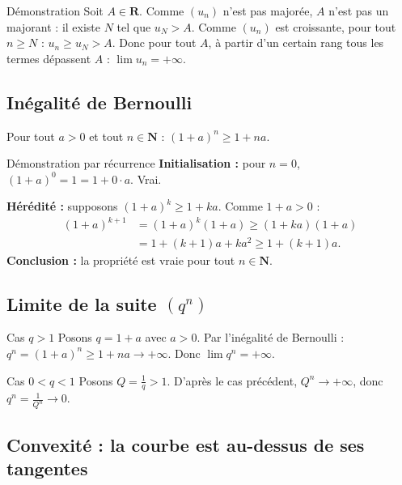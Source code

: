 \documentclass[11pt,a4paper,openany]{book}
\theoremstyle{definition}
\begin{document}
    \begin{methodebox}{Démonstration}
    Soit $A\in\mathbf{R}$. Comme $(u_n)$ n'est pas majorée, $A$ n'est pas un majorant : il existe $N$ tel que $u_N>A$.
    Comme $(u_n)$ est croissante, pour tout $n\geq N$ : $u_n\geq u_N>A$.
    Donc pour tout $A$, à partir d'un certain rang tous les termes dépassent $A$ : $\lim u_n=+\infty$.
    \end{methodebox}

    \subsection{Inégalité de Bernoulli}

    \begin{enoncebox}
    Pour tout $a>0$ et tout $n\in\mathbf{N}$ : $(1+a)^n\geq 1+na$.
    \end{enoncebox}

    \begin{methodebox}{Démonstration par récurrence}
    \textbf{Initialisation :} pour $n=0$, $(1+a)^0=1=1+0\cdot a$. Vrai.

    \textbf{Hérédité :} supposons $(1+a)^k\geq 1+ka$. Comme $1+a>0$ :
    \begin{align*}
    (1+a)^{k+1}&=(1+a)^k(1+a)\geq(1+ka)(1+a)\\
    &=1+(k+1)a+ka^2\geq 1+(k+1)a.
    \end{align*}
    \textbf{Conclusion :} la propriété est vraie pour tout $n\in\mathbf{N}$.
    \end{methodebox}

    \subsection{Limite de la suite $(q^n)$}

    \begin{methodebox}{Cas $q>1$}
    Posons $q=1+a$ avec $a>0$. Par l'inégalité de Bernoulli : $q^n=(1+a)^n\geq 1+na\to+\infty$.
    Donc $\lim q^n=+\infty$.
    \end{methodebox}

    \begin{methodebox}{Cas $0<q<1$}
    Posons $Q=\frac{1}{q}>1$. D'après le cas précédent, $Q^n\to+\infty$, donc $q^n=\frac{1}{Q^n}\to 0$.
    \end{methodebox}

    \subsection{Convexité : la courbe est au-dessus de ses tangentes}
\end{document}
